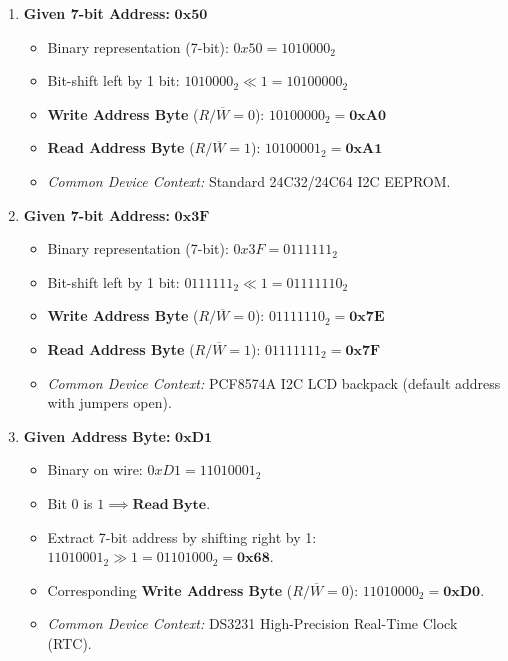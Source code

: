 \documentclass[11pt,a4paper]{article}
\begin{document}
\begin{enumerate}
    \item[\textbf{(a)}] \textbf{Given 7-bit Address:} $\mathbf{0x50}$
    \begin{itemize}
        \item Binary representation (7-bit): $0x50 = 1010000_2$
        \item Bit-shift left by 1 bit: $1010000_2 \ll 1 = 10100000_2$
        \item \textbf{Write Address Byte} ($R/\overline{W} = 0$): $10100000_2 = \mathbf{0xA0}$
        \item \textbf{Read Address Byte} ($R/\overline{W} = 1$): $10100001_2 = \mathbf{0xA1}$
        \item \textit{Common Device Context:} Standard 24C32/24C64 I2C EEPROM.
    \end{itemize}

    \item[\textbf{(b)}] \textbf{Given 7-bit Address:} $\mathbf{0x3F}$
    \begin{itemize}
        \item Binary representation (7-bit): $0x3F = 0111111_2$
        \item Bit-shift left by 1 bit: $0111111_2 \ll 1 = 01111110_2$
        \item \textbf{Write Address Byte} ($R/\overline{W} = 0$): $01111110_2 = \mathbf{0x7E}$
        \item \textbf{Read Address Byte} ($R/\overline{W} = 1$): $01111111_2 = \mathbf{0x7F}$
        \item \textit{Common Device Context:} PCF8574A I2C LCD backpack (default address with jumpers open).
    \end{itemize}

    \item[\textbf{(c)}] \textbf{Given Address Byte:} $\mathbf{0xD1}$
    \begin{itemize}
        \item Binary on wire: $0xD1 = 11010001_2$
        \item Bit 0 is $1 \implies \mathbf{Read\;Byte}$.
        \item Extract 7-bit address by shifting right by 1: $11010001_2 \gg 1 = 01101000_2 = \mathbf{0x68}$.
        \item Corresponding \textbf{Write Address Byte} ($R/\overline{W} = 0$): $11010000_2 = \mathbf{0xD0}$.
        \item \textit{Common Device Context:} DS3231 High-Precision Real-Time Clock (RTC).
    \end{itemize}


\end{enumerate}
\end{document}
